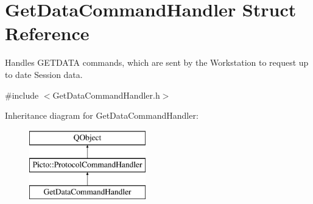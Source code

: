 \hypertarget{struct_get_data_command_handler}{\section{Get\-Data\-Command\-Handler Struct Reference}
\label{struct_get_data_command_handler}
}


Handles G\-E\-T\-D\-A\-T\-A commands, which are sent by the Workstation to request up to date Session data.  




{\ttfamily \#include $<$Get\-Data\-Command\-Handler.\-h$>$}

Inheritance diagram for Get\-Data\-Command\-Handler\-:\begin{figure}[H]
\begin{center}
\leavevmode
\includegraphics[height=3.000000cm]{struct_get_data_command_handler}
\end{center}
\end{figure}
